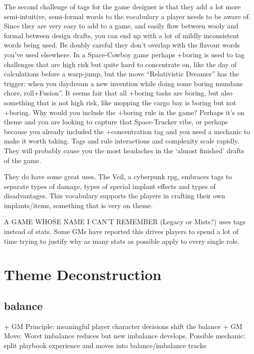 \documentclass{tufte-handout}
\begin{document}
The second challenge of tags for the game designer is that they add a lot more semi-intuitive, semi-formal   words to the vocabulary a player needs to be aware of.  Since they are very easy to add to a game, and easily flow between wooly and formal between design drafts, you can end up with a lot of mildly inconsistent words being used. Be doubly careful they don't overlap with the flavour words you've used elsewhere. In a Space-Cowboy game perhaps +boring is used to tag challenges that are high risk but quite hard to concentrate on, like the day of calculations before a warp-jump, but the move ``Relativistic Dreamer'' has the trigger: when you daydream a new invention while doing some boring mundane chore, roll+Fusion''. It seems fair that all +boring tasks are boring, but also something that is not high risk, like mopping the cargo bay is boring but not +boring.
Why would you include the +boring rule in the game? Perhaps it's on theme and you are looking to capture that Space-Trucker vibe, or perhaps because you already included the +concentration tag and you need a mechanic to make it worth taking. Tags and rule interactions and complexity scale rapidly. They will probably cause you the most headaches in the `almost finished' drafts of the game.

They do have some great uses. The Veil, a cyberpunk rpg, embraces tags to separate types of damage, types of special implant effects and types of disadvantages. This vocabulary supports the players in crafting their own implants/items, something that is very on theme.

A GAME WHOSE NAME I CAN'T REMEMBER (Legacy or Mists?) uses tags instead of stats. Some GMs have reported this drives players to spend a lot of time trying to justify why as many stats as possible apply to every single role. 



\section{Theme Deconstruction}

\subsection{balance}
+ GM Principle: meaningful player character decisions shift the balance
+ GM Move: Worst imbalance reduces but new imbalance develops.	
Possible mechanic: split playbook experience and moves into balance/imbalance tracks
\end{document}
